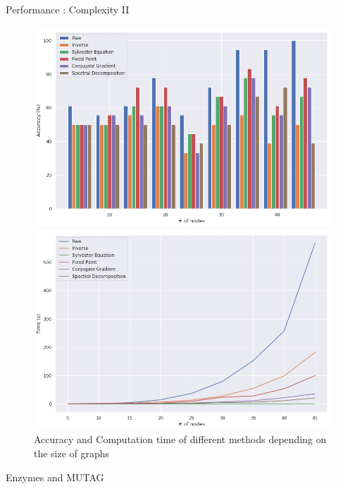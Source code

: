 \documentclass[compress]{beamer}
\begin{document}
\begin{frame}{Performance : Complexity II}
\begin{figure}[!htb]
	\begin{multicols}{2}
		\includegraphics[width=\linewidth]{data/nb_nodes/acc.png}\par
		\includegraphics[width=\linewidth]{data/nb_nodes/time.png}\par
	\end{multicols}
	\caption*{Accuracy and Computation time of different methods depending on the size of graphs}
\end{figure}
\end{frame}
\begin{frame}{Enzymes and MUTAG}

\end{frame}
\end{document}
